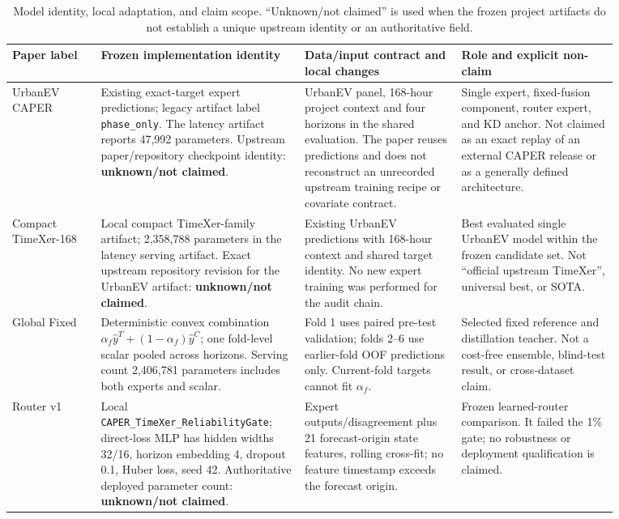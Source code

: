 \begin{table}[htbp]
\centering
\caption{Model identity, local adaptation, and claim scope.  ``Unknown/not claimed'' is used when the frozen project artifacts do not establish a unique upstream identity or an authoritative field.}
\label{tab:model-identity}
\providecommand{\modelidentityfontsize}{\scriptsize}
\modelidentityfontsize
\begin{tabular}{>{\raggedright\arraybackslash}p{0.13\linewidth}>{\raggedright\arraybackslash}p{0.28\linewidth}>{\raggedright\arraybackslash}p{0.23\linewidth}>{\raggedright\arraybackslash}p{0.23\linewidth}}
\toprule
Paper label & Frozen implementation identity & Data/input contract and local changes & Role and explicit non-claim \\
\midrule
UrbanEV CAPER & Existing exact-target expert predictions; legacy artifact label \texttt{phase\_only}.  The latency artifact reports 47,992 parameters.  Upstream paper/repository checkpoint identity: \textbf{unknown/not claimed}. & UrbanEV panel, 168-hour project context and four horizons in the shared evaluation.  The paper reuses predictions and does not reconstruct an unrecorded upstream training recipe or covariate contract. & Single expert, fixed-fusion component, router expert, and KD anchor.  Not claimed as an exact replay of an external CAPER release or as a generally defined architecture. \\
Compact TimeXer-168 & Local compact TimeXer-family artifact; 2,358,788 parameters in the latency serving artifact.  Exact upstream repository revision for the UrbanEV artifact: \textbf{unknown/not claimed}. & Existing UrbanEV predictions with 168-hour context and shared target identity.  No new expert training was performed for the audit chain. & Best evaluated single UrbanEV model within the frozen candidate set.  Not ``official upstream TimeXer'', universal best, or SOTA. \\
Global Fixed & Deterministic convex combination $\alpha_f\widehat y^{T}+(1-\alpha_f)\widehat y^{C}$; one fold-level scalar pooled across horizons.  Serving count 2,406,781 parameters includes both experts and scalar. & Fold 1 uses paired pre-test validation; folds 2--6 use earlier-fold OOF predictions only.  Current-fold targets cannot fit $\alpha_f$. & Selected fixed reference and distillation teacher.  Not a cost-free ensemble, blind-test result, or cross-dataset claim. \\
Router v1 & Local \texttt{CAPER\_TimeXer\_ReliabilityGate}; direct-loss MLP has hidden widths 32/16, horizon embedding 4, dropout 0.1, Huber loss, seed 42.  Authoritative deployed parameter count: \textbf{unknown/not claimed}. & Expert outputs/disagreement plus 21 forecast-origin state features, rolling cross-fit; no feature timestamp exceeds the forecast origin. & Frozen learned-router comparison.  It failed the 1\% gate; no robustness or deployment qualification is claimed. \\

\end{tabular}
\end{table}
